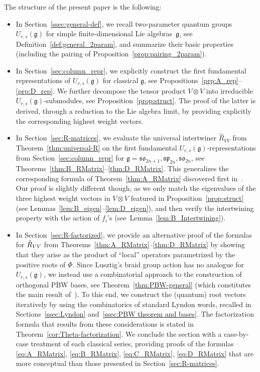 \documentclass[10pt,a4paper]{amsart}
\numberwithin{equation}{section}
\newcommand{\fg}{\mathfrak{g}}
\newcommand{\sso}{\mathfrak{so}}
\newcommand{\ssp}{\mathfrak{sp}}
\newcommand{\uu}{U_{r,s}(\fg)}
\begin{document}
The structure of the present paper is the following:
\begin{itemize}\itemsep=0pt
\item[$\bullet$]
In Section~\ref{ssec:general-def}, we recall  two-parameter quantum groups $U_{r,s}(\fg)$ for simple finite-dimen\-sional Lie algebras~$\fg$, see Definition~\ref{def:general_2param}, and summarize their basic properties (including the pairing of Proposition~\ref{prop:pairing_2param}).


\item[$\bullet$]
In Section~\ref{sec:column_repr}, we explicitly construct the first fundamental representations of $U_{r,s}(\fg)$ for classical $\fg$, see Propositions~\ref{prp:A_rep}--\ref{prp:D_rep}. We further decompose the tensor product $V\otimes V$ into irreducible $U_{r,s}(\fg)$-submodules, see Proposition~\ref{prop:struct}. The proof of the latter is derived, through a reduction to the Lie algebra limit, by providing explicitly the corresponding highest weight vectors.

\item[$\bullet$]
In Section~\ref{sec:R-matrices}, we evaluate the universal intertwiner $\hat{R}_{VV}$ from Theorem~\ref{thm:universal-R} on the first fundamental $\uu$-representations from Section~\ref{sec:column_repr} for $\fg=\sso_{2n+1},\ssp_{2n},\sso_{2n}$, see Theorems~\ref{thm:B_RMatrix}--\ref{thm:D_RMatrix}. This generalizes the corresponding formula of Theorem~\ref{thm:A_RMatrix} discovered first in~\cite{BW2}. Our proof is slightly different though, as we only match the eigenvalues of the three highest weight vectors in $V\otimes V$ featured in Proposition~\ref{prop:struct} (see Lemmas~\ref{lem:B_eigen}--\ref{lem:D_eigen}), and then verify the intertwining property with the action of $f_i$'s (see~Lemma~\ref{lem:B_Intertwining}).

\item[$\bullet$]
In Section~\ref{sec:R-factorized}, we provide an alternative proof of the formulas for $\hat{R}_{VV}\hspace{-0.67pt}$ from Theorems~\mbox{\ref{thm:A_RMatrix}--\ref{thm:D_RMatrix}} by showing that they arise as the product of ``local'' operators parametrized by the positive roots of $\Phi$. Since Lusztig's braid group action has no analogue for $\uu$, we instead use a combinatorial approach to the construction of orthogonal PBW bases, see Theorem~\ref{thm:PBW-general} (which constitutes the main result of~\cite{MT1}). To this end, we construct the (quantum) root vectors iteratively by using the combinatorics of standard Lyndon words, recalled in Sections~\ref{ssec:Lyndon} and~\ref{ssec:PBW theorem and bases}. The factorization formula that results from these considerations is stated in Theorem~\ref{cor:Theta-factorization}. We conclude the section with a case-by-case treatment of each classical series, providing proofs of the formulas \eqref{eq:A_RMatrix}, \eqref{eq:B_RMatrix}, \eqref{eq:C_RMatrix}, \eqref{eq:D_RMatrix} that are more conceptual than those presented in Section~\ref{sec:R-matrices}.


\end{itemize}
\end{document}
